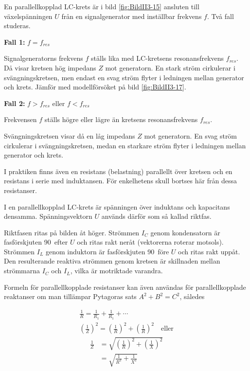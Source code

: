 En parallellkopplad LC-krets är i bild \ref{fig:BildII3-15} ansluten till
växelspänningen \(U\) från en signalgenerator med inställbar frekvens \(f\).
Två fall studeras.

\textbf{Fall 1:} \(f = f_{res}\)

Signalgeneratorns frekvens \(f\) ställs lika med LC-kretsens resonansfrekvens
\(f_{res}\).
Då visar kretsen hög impedans \(Z\) mot generatorn.
En stark ström cirkulerar i svängningskretsen, men endast en svag ström flyter
i ledningen mellan generator och krets.
Jämför med modellförsöket på bild \ref{fig:BildII3-17}.

\textbf{Fall 2:} \(f > f_{res}\) eller \(f < f_{res}\)

Frekvensen \(f\) ställs högre eller lägre än kretsens resonansfrekvens
\(f_{res}\).

Svängningskretsen visar då en låg impedans \(Z\) mot generatorn.
En svag ström cirkulerar i svängningskretsen, medan en starkare ström flyter i
ledningen mellan generator och krets.

I praktiken finns även en resistans (belastning) parallellt över kretsen och en
resistans i serie med induktansen.
För enkelhetens skull bortses här från dessa resistanser.

I en parallellkopplad LC-krets är spänningen över induktans och kapacitans
densamma.
Spänningsvektorn \(U\) används därför som så kallad riktfas.

Riktfasen ritas på bilden åt höger.
Strömmen \(I_C\) genom kondensatorn är fasförskjuten 90\degree~efter \(U\) och
ritas rakt neråt (vektorerna roterar motsols).
Strömmen \(I_L\) genom induktorn är fasförskjuten 90\degree~före \(U\) och
ritas rakt uppåt.
Den resulterande reaktiva strömmen genom kretsen är skillnaden mellan
strömmarna \(I_C\) och \(I_L\), vilka är motriktade varandra.

Formeln för parallellkopplade resistanser kan även användas för
parallellkopplade reaktanser om man tillämpar Pytagoras sats
\(A^2 + B^2 = C^2\), således

\begin{gather*}
  \frac{1}{R} = \frac{1}{R_1} + \frac{1}{R_1} + \cdots \\
  \left(\frac{1}{Z}\right)^2 = \left(\frac{1}{R}\right)^2 +
  \left(\frac{1}{R}\right)^2 \quad \text{eller}
\end{gather*}
\begin{align*}
  \frac{1}{Z} &=
  \sqrt{\left(\frac{1}{R}\right)^2 + \left(\frac{1}{X}\right)^2} \\
  &= \sqrt{\frac{1}{R^2} + \frac{1}{X^2}}
\end{align*}

